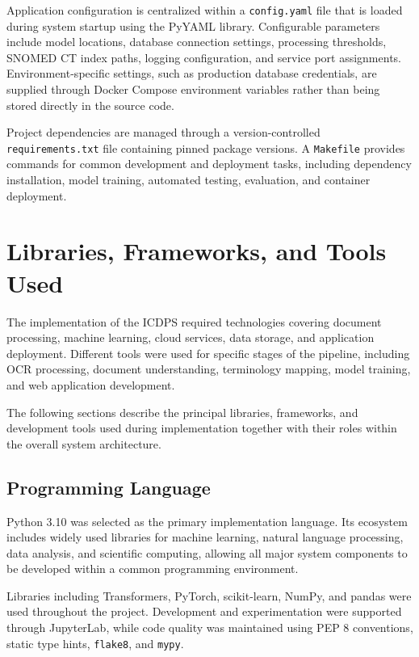 Application configuration is centralized within a \texttt{config.yaml} file that is loaded during system startup using the PyYAML library. Configurable parameters include model locations, database connection settings, processing thresholds, SNOMED CT index paths, logging configuration, and service port assignments. Environment-specific settings, such as production database credentials, are supplied through Docker Compose environment variables rather than being stored directly in the source code.

Project dependencies are managed through a version-controlled \texttt{requirements.txt} file containing pinned package versions. A \texttt{Makefile} provides commands for common development and deployment tasks, including dependency installation, model training, automated testing, evaluation, and container deployment.

\section{Libraries, Frameworks, and Tools Used}

The implementation of the ICDPS required technologies covering document processing, machine learning, cloud services, data storage, and application deployment. Different tools were used for specific stages of the pipeline, including OCR processing, document understanding, terminology mapping, model training, and web application development.

The following sections describe the principal libraries, frameworks, and development tools used during implementation together with their roles within the overall system architecture.

\subsection{Programming Language}

Python 3.10 was selected as the primary implementation language. Its ecosystem includes widely used libraries for machine learning, natural language processing, data analysis, and scientific computing, allowing all major system components to be developed within a common programming environment.

Libraries including Transformers, PyTorch, scikit-learn, NumPy, and pandas were used throughout the project. Development and experimentation were supported through JupyterLab, while code quality was maintained using PEP 8 conventions, static type hints, \texttt{flake8}, and \texttt{mypy}.

